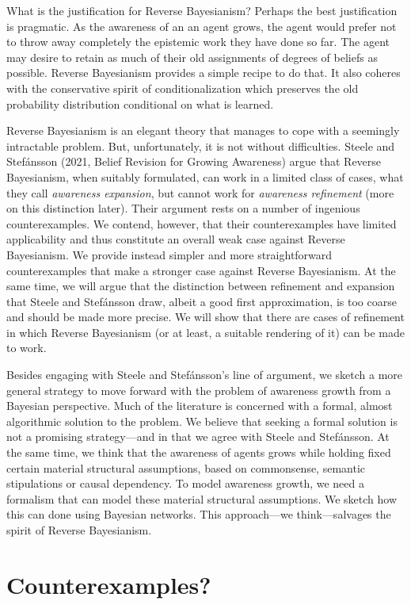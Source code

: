 \documentclass[
  11pt,
  dvipsnames,enabledeprecatedfontcommands]{scrartcl}
\begin{document}
What is the justification for Reverse Bayesianism? Perhaps the best
justification is pragmatic. As the awareness of an an agent grows, the
agent would prefer not to throw away completely the epistemic work they
have done so far. The agent may desire to retain as much of their old
assignments of degrees of beliefs as possible. Reverse Bayesianism
provides a simple recipe to do that. It also coheres with the
conservative spirit of conditionalization which preserves the old
probability distribution conditional on what is learned.

Reverse Bayesianism is an elegant theory that manages to cope with a
seemingly intractable problem. But, unfortunately, it is not without
difficulties. Steele and Stefánsson (2021, Belief Revision for Growing
Awareness) argue that Reverse Bayesianism, when suitably formulated, can
work in a limited class of cases, what they call
\textit{awareness expansion}, but cannot work for
\textit{awareness refinement} (more on this distinction later). Their
argument rests on a number of ingenious counterexamples. We contend,
however, that their counterexamples have limited applicability and thus
constitute an overall weak case against Reverse Bayesianism. We provide
instead simpler and more straightforward counterexamples that make a
stronger case against Reverse Bayesianism. At the same time, we will
argue that the distinction between refinement and expansion that Steele
and Stefánsson draw, albeit a good first approximation, is too coarse
and should be made more precise. We will show that there are cases of
refinement in which Reverse Bayesianism (or at least, a suitable
rendering of it) can be made to work.

Besides engaging with Steele and Stefánsson's line of argument, we
sketch a more general strategy to move forward with the problem of
awareness growth from a Bayesian perspective. Much of the literature is
concerned with a formal, almost algorithmic solution to the problem. We
believe that seeking a formal solution is not a promising strategy---and
in that we agree with Steele and Stefánsson. At the same time, we think
that the awareness of agents grows while holding fixed certain material
structural assumptions, based on commonsense, semantic stipulations or
causal dependency. To model awareness growth, we need a formalism that
can model these material structural assumptions. We sketch how this can
done using Bayesian networks. This approach---we think---salvages the
spirit of Reverse Bayesianism.

\hypertarget{counterexamples}{%
\section{Counterexamples?}\label{counterexamples}}
\end{document}
